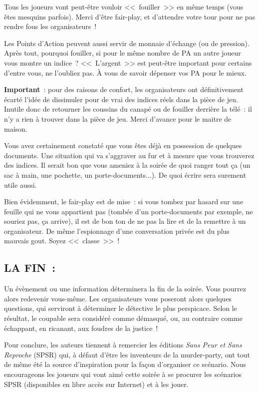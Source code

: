 \documentclass[14pt,twocolumn]{extarticle}
\begin{document}
Tous les joueurs vont peut-être vouloir <<~fouiller~>> en même temps (vous êtes
mesquins parfois). Merci d'être fair-play, et d'attendre votre tour pour ne pas
rendre fous les organisateurs~!

Les Points d'Action peuvent aussi servir de monnaie d'échange (ou de pression).
Après tout, pourquoi fouiller, si pour le même nombre de PA un autre joueur
vous montre un indice~? <<~L'argent~>> est peut-être important pour certains
d'entre vous, ne l'oubliez pas. À vous de savoir dépenser vos PA pour le mieux.

\textbf{Important}~: pour des raisons de confort, les organisateurs ont
définitivement écarté l'idée de dissimuler pour de vrai des indices réels dans
la pièce de jeu. Inutile donc de retourner les coussins du canapé ou de
fouiller derrière la télé~: il n'y a rien à trouver dans la pièce de jeu. Merci
d'avance pour le maitre de maison.

Vous avez certainement constaté que vous êtes déjà en possession de quelques
documents. Une situation qui va s'aggraver au fur et à mesure que vous
trouverez des indices. Il serait bon que vous ameniez à la soirée de quoi
ranger tout ça (un sac à main, une pochette, un porte-documents...). De quoi
écrire sera surement utile aussi.

Bien évidemment, le fair-play est de mise~: si vous tombez par hasard sur une
feuille qui ne vous appartient pas (tombée d'un porte-documents par exemple, ne
souriez pas, ça arrive), il est de bon ton de ne pas la lire et de la remettre
à un organisateur. De même l'espionnage d'une conversation privée est du plus
mauvais gout. Soyez <<~classe~>>~!

\subsection{LA FIN~:}

Un évènement ou une information déterminera la fin de la soirée. Vous pourrez
alors redevenir vous-même. Les organisateurs vous poseront alors quelques
questions, qui serviront à déterminer le détective le plus perspicace. Selon le
résultat, le coupable sera considéré comme démasqué, ou, au contraire comme
échappant, en ricanant, aux foudres de la justice~!

Pour conclure, les auteurs tiennent à remercier les éditions \textit{Sans Peur
et Sans Reproche} (SPSR) qui, à défaut d'être les inventeurs de la
murder-party, ont tout de même été la source d'inspiration pour la façon
d'organiser ce scénario. Nous encourageons les joueurs qui vont aimé cette
soirée à se procurer les scénarios SPSR (disponibles en libre accès sur
Internet) et à les jouer.
\end{document}
